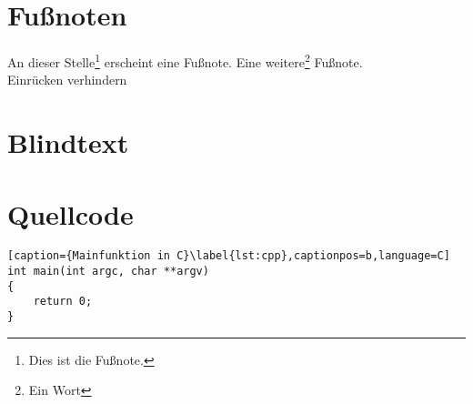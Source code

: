 \section{Fußnoten}
\label{sec:Fussnoten}

An dieser Stelle\footnote{Dies ist die Fußnote.} erscheint eine Fußnote. Eine weitere\footnote{Ein Wort} Fußnote.\\
\noindent
Einrücken verhindern

\section{Blindtext}
\label{sec:Blindtext}

\lipsum[1-2]

\section{Quellcode}
\label{sec:Quellcode}

\begin{lstlisting}[caption={Mainfunktion in C}\label{lst:cpp},captionpos=b,language=C]
int main(int argc, char **argv)
{
	return 0;
}
\end{lstlisting}